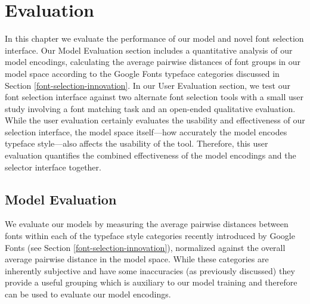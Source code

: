 \chapter{Evaluation}
\label{chap:evaluation}

In this chapter we evaluate the performance of our model and novel font selection interface. Our Model Evaluation section includes a quantitative analysis of our model encodings, calculating the average pairwise distances of font groups in our model space according to the Google Fonts typeface categories discussed in Section \ref{font-selection-innovation}. In our User Evaluation section, we test our font selection interface against two alternate font selection tools with a small user study involving a font matching task and an open-ended qualitative evaluation. While the user evaluation certainly evaluates the usability and effectiveness of our selection interface, the model space itself---how accurately the model encodes typeface style---also affects the usability of the tool. Therefore, this user evaluation quantifies the combined effectiveness of the model encodings and the selector interface together.

\section{Model Evaluation} \label{model-eval}

We evaluate our models by measuring the average pairwise distances between fonts within each of the typeface style categories recently introduced by Google Fonts (see Section \ref{font-selection-innovation}), normalized against the overall average pairwise distance in the model space. While these categories are inherently subjective and have some inaccuracies (as previously discussed) they provide a useful grouping which is auxiliary to our model training and therefore can be used to evaluate our model encodings.

